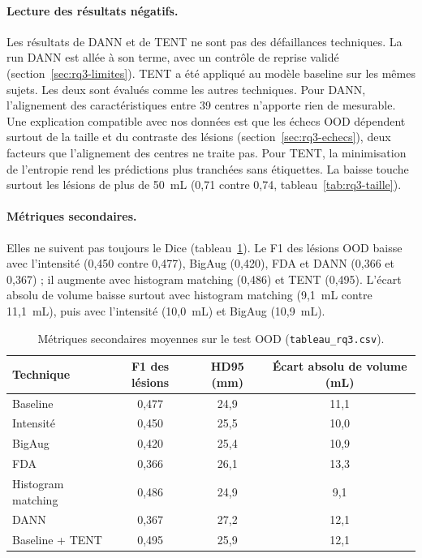 \paragraph{Lecture des résultats négatifs.}
Les résultats de DANN et de TENT ne sont pas des défaillances techniques. La run DANN est allée à son terme, avec un contrôle de reprise validé (section~\ref{sec:rq3-limites}). TENT a été appliqué au modèle baseline sur les mêmes sujets. Les deux sont évalués comme les autres techniques.
Pour DANN, l'alignement des caractéristiques entre 39 centres n'apporte rien de mesurable.
Une explication compatible avec nos données est que les échecs OOD dépendent surtout de la taille et du contraste des lésions (section~\ref{sec:rq3-echecs}), deux facteurs que l'alignement des centres ne traite pas.
Pour TENT, la minimisation de l'entropie rend les prédictions plus tranchées sans étiquettes. La baisse touche surtout les lésions de plus de 50~mL (0,71 contre 0,74, tableau~\ref{tab:rq3-taille}).

\paragraph{Métriques secondaires.}
Elles ne suivent pas toujours le Dice (tableau~\ref{tab:rq3-secondaires}).
Le F1 des lésions OOD baisse avec l'intensité (0,450 contre 0,477), BigAug (0,420), FDA et DANN (0,366 et 0,367) ; il augmente avec histogram matching (0,486) et TENT (0,495).
L'écart absolu de volume baisse surtout avec histogram matching (9,1~mL contre 11,1~mL), puis avec l'intensité (10,0~mL) et BigAug (10,9~mL).

\begin{table}[htbp]
  \centering
  \caption{Métriques secondaires moyennes sur le test OOD (\texttt{tableau\_rq3.csv}).}
  \label{tab:rq3-secondaires}
  \begin{tabular}{lccc}
    \toprule
    Technique & F1 des lésions & HD95 (mm) & Écart absolu de volume (mL) \\
    \midrule
    Baseline & 0,477 & 24,9 & 11,1 \\
    Intensité & 0,450 & 25,5 & 10,0 \\
    BigAug & 0,420 & 25,4 & 10,9 \\
    FDA & 0,366 & 26,1 & 13,3 \\
    Histogram matching & 0,486 & 24,9 & 9,1 \\
    DANN & 0,367 & 27,2 & 12,1 \\
    Baseline + TENT & 0,495 & 25,9 & 12,1 \\
    \bottomrule
  \end{tabular}
\end{table}

